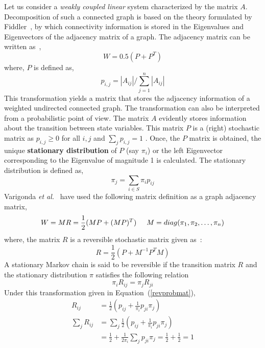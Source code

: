 Let us consider a \textit{weakly coupled linear} system characterized by the matrix $A$. Decomposition of such a connected graph is based on the theory formulated by Fiddler~\cite{fiedler1973algebraic,fiedler1975property}, by which connectivity information is stored in the Eigenvalues and Eigenvectors of the adjacency matrix of a graph. The adjacency matrix can be written as~\cite{varigonda2004graph},
\begin{equation}
\label{adjcncy}
W = 0.5(P + P^T)
\end{equation}
where, $P$ is defined as,
\begin{equation}
\label{probmat}
p_{i,j} = | A_{ij} | /  \sum_{j=1}^n | A_{ij} |
\end{equation}
This transformation yields a matrix that stores the adjacency information of a weighted undirected connected graph. The transformation can also be interpreted from a probabilistic point of view. The matrix $A$ evidently stores information about the transition between state variables. This matrix $P$ is a (right) stochastic matrix as $p_{i,j} \ge 0$ for all $i,j$ and $\sum_j p_{i,j} = 1$ \cite{wolfowitz1963products}. Once, the $P$ matrix is obtained, the unique \textbf{stationary distribution} of $P$ (say $\pi_i$) or the left Eigenvector corresponding to the Eigenvalue of magnitude 1 is calculated. The stationary distribution is defined as, 
\begin{equation}
\pi_{j} =  \sum_{i \in S} \pi_i p_{ij} 
\end{equation}
Varigonda \textit{et al.}~\cite{varigonda2004graph} have used the following matrix definition as a graph adjacency matrix,
\begin{equation}
\label{wead}
W = MR = \frac{1}{2}(MP + (MP)^T)  \hspace{5 mm} M = diag(\pi_1,\pi_2,\ldots,\pi_n)
\end{equation}
where, the matrix $R$ is a reversible stochastic matrix given as~\cite{dellnitz2003congestion}: 
\begin{equation}
\label{revprobmat}
R = \frac{1}{2}(P + M^{-1} P^T M)
\end{equation}
A stationary Markov chain is said to be reversible if the transition matrix $R$ and the stationary distribution $\pi$ satisfies the following relation
\begin{equation}
\pi_i R_{ij} = \pi_j R_{ji}
\end{equation}
Under this transformation given in Equation~(\ref{revprobmat}), 
\begin{equation*}
\begin{array}{rl}
R_{ij} &= \frac{1}{2}\left(p_{ij} + \frac{1}{\pi_i}p_{ji}\pi_j \right) \\
\sum_j R_{ij} &= \sum_j \frac{1}{2}\left(p_{ij} + \frac{1}{\pi_i}p_{ji}\pi_j \right) \\
&= \frac{1}{2} + \frac{1}{2 \pi_i} \sum_j p_{ji} \pi_j = \frac{1}{2} + \frac{1}{2} =1
\end{array}
\end{equation*}
